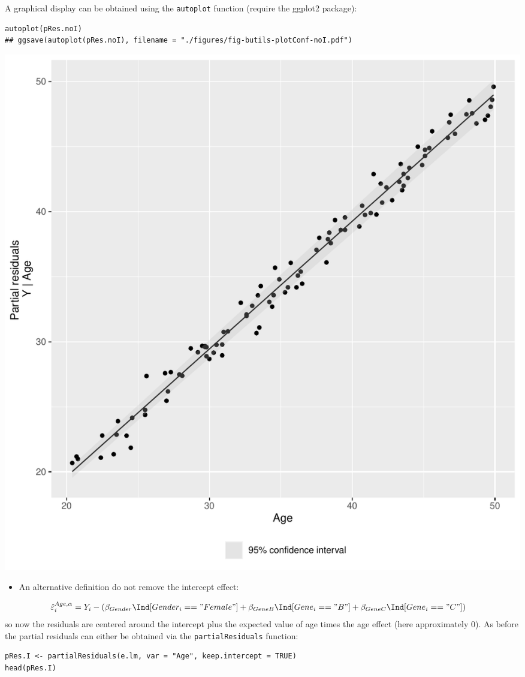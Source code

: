\documentclass{article}
\begin{document}
A graphical display can be obtained using the \texttt{autoplot} function
(require the ggplot2 package):
\lstset{language=r,label= ,caption= ,captionpos=b,numbers=none}
\begin{lstlisting}
autoplot(pRes.noI)
## ggsave(autoplot(pRes.noI), filename = "./figures/fig-butils-plotConf-noI.pdf")
\end{lstlisting}

\begin{center}
\includegraphics[width=1\textwidth]{./figures/fig-butils-plotConf-noI.pdf}
\end{center}

\begin{itemize}
\item An alternative definition do not remove the intercept effect:
\end{itemize}
\begin{align*}
\hat{\varepsilon}^{Age,\alpha}_i &= Y_i - \left(\beta_{Gender} \Ind[Gender_i=="Female"] + \beta_{GeneB} \Ind[Gene_i=="B"] + \beta_{GeneC} \Ind[Gene_i=="C"]\right)
\end{align*}
so now the residuals are centered around the intercept plus the
expected value of age times the age effect (here approximately 0). As
before the partial residuals can either be obtained via the
\texttt{partialResiduals} function:
\lstset{language=r,label= ,caption= ,captionpos=b,numbers=none}
\begin{lstlisting}
pRes.I <- partialResiduals(e.lm, var = "Age", keep.intercept = TRUE)
head(pRes.I)
\end{lstlisting}
\end{document}
